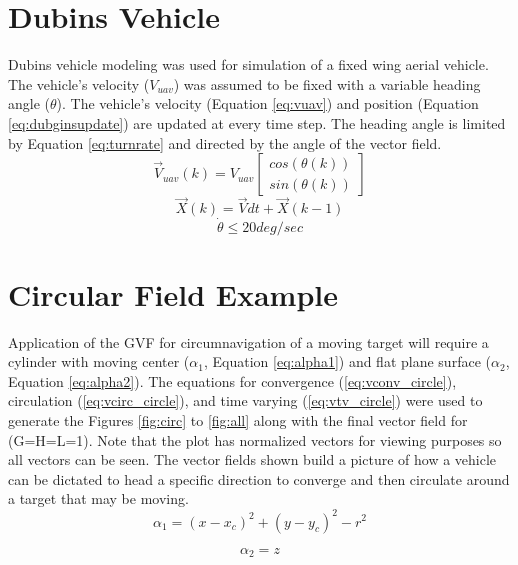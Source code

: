 \documentclass[conf]{new-aiaa}
\begin{document}
\section{Dubins Vehicle}
Dubins vehicle modeling was used for simulation of a fixed wing aerial vehicle. The vehicle's velocity ($V_{uav}$) was assumed to be fixed with a variable heading angle ($\theta$). The vehicle's velocity (Equation \ref{eq:vuav}) and position (Equation \ref{eq:dubginsupdate}) are updated at every time step. The heading angle is limited by Equation \ref{eq:turnrate} and directed by the angle of the vector field.
\begin{equation}\label{eq:vuav}
\overrightarrow{V}_{uav}(k) =  V_{uav} \begin{bmatrix} cos(\theta(k)) \\ sin(\theta(k)) \end{bmatrix}
\end{equation}
\begin{equation}\label{eq:dubginsupdate}
\overrightarrow{X}(k) =  \overrightarrow{V} dt + \overrightarrow{X}(k-1) 
\end{equation}
\begin{equation}\label{eq:turnrate}
\dot{\theta} \le 20 deg/sec
\end{equation}

\section{Circular Field Example}
Application of the GVF for circumnavigation of a moving target will require a cylinder with moving center ($\alpha_1$, Equation \ref{eq:alpha1}) and flat plane surface ($\alpha_2$, Equation \ref{eq:alpha2}). The equations for convergence (\ref{eq:vconv_circle}), circulation (\ref{eq:vcirc_circle}), and time varying (\ref{eq:vtv_circle}) were used to generate the Figures \ref{fig:circ} to \ref{fig:all} along with the final vector field for (G=H=L=1). Note that the plot has normalized vectors for viewing purposes so all vectors can be seen. The vector fields shown build a picture of how a vehicle can be dictated to head a specific direction to converge and then circulate around a target that may be moving.
\begin{equation}\label{eq:alpha1}
\alpha_1 = (x-x_c)^2 + (y-y_c)^2-r^2
\end{equation}

\begin{equation}\label{eq:alpha2}
\alpha_2 = z
\end{equation}
\end{document}
